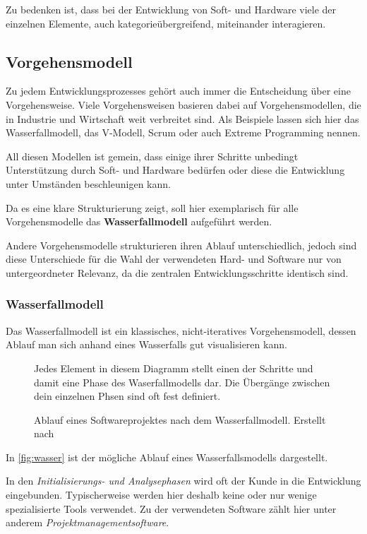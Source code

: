 Zu bedenken ist, dass bei der Entwicklung von Soft- und Hardware viele der
einzelnen Elemente, auch kategorieübergreifend, miteinander interagieren. 
\subsection{Vorgehensmodell}
Zu jedem Entwicklungsprozesses gehört auch immer die Entscheidung über eine
Vorgehensweise. Viele Vorgehensweisen basieren dabei auf Vorgehensmodellen,
die in Industrie und Wirtschaft weit verbreitet sind. Als Beispiele lassen sich
hier das Wasserfallmodell, das V-Modell, Scrum oder auch Extreme Programming
nennen.

All diesen Modellen ist gemein, dass einige ihrer Schritte
unbedingt Unterstützung durch Soft- und Hardware bedürfen oder
diese die Entwicklung unter Umständen beschleunigen kann.

Da es eine klare Strukturierung zeigt, soll hier exemplarisch für alle
Vorgehensmodelle das \textbf{Wasserfallmodell} aufgeführt werden.

Andere Vorgehensmodelle strukturieren ihren Ablauf unterschiedlich, jedoch sind
diese Unterschiede für die Wahl der verwendeten Hard- und Software nur von
untergeordneter Relevanz, da die zentralen Entwicklungsschritte
identisch sind.

\subsubsection*{Wasserfallmodell}
Das Wasserfallmodell ist ein klassisches, nicht-iteratives Vorgehensmodell,
dessen Ablauf man sich anhand eines Wasserfalls gut visualisieren kann. 

\begin{figure}[!ht]
\centering
\def\svgwidth{\columnwidth}

\caption{Ablauf eines Softwareprojektes nach dem Wasserfallmodell. Erstellt nach
\cite{WP01}}{Jedes Element in diesem Diagramm stellt einen der Schritte und
damit eine Phase des Waserfallmodells dar. Die Übergänge zwischen dein
einzelnen Phsen sind oft fest definiert.}
\label{fig:wasser}
\end{figure}

In \autoref{fig:wasser} ist der mögliche Ablauf eines Wasserfallsmodells
dargestellt.

In den \emph{Initialisierungs- und Analysephasen} wird oft der Kunde in die
Entwicklung eingebunden. Typischerweise werden hier deshalb keine oder nur
wenige spezialisierte Tools verwendet. Zu der verwendeten Software zählt hier
unter anderem \emph{Projektmanagementsoftware}.

